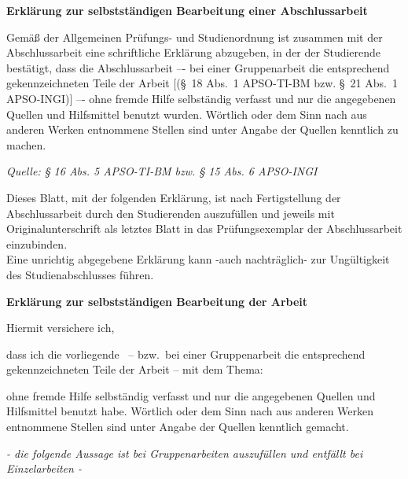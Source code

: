 \clearpage
\thispagestyle{plain}
\ITocEntryStatement
\textbf{\sffamily\large Erklärung zur selbstständigen Bearbeitung einer Abschlussarbeit}

{\footnotesize
Gemäß der Allgemeinen Prüfungs- und Studienordnung ist zusammen mit der Abschlussarbeit eine schriftliche Erklärung abzugeben, in der der Studierende bestätigt, dass die Abschlussarbeit \glqq–- bei einer Gruppenarbeit die entsprechend gekennzeichneten Teile der Arbeit [(§~18 Abs.~1 APSO-TI-BM bzw. §~21 Abs.~1 APSO-INGI)] –- ohne fremde Hilfe selbständig verfasst und nur die angegebenen Quellen und Hilfsmittel benutzt wurden. Wörtlich oder dem Sinn nach aus anderen Werken entnommene Stellen sind unter Angabe der Quellen kenntlich zu machen.\grqq
}

\hfill {\em\footnotesize Quelle: § 16 Abs. 5 APSO-TI-BM bzw. § 15 Abs. 6 APSO-INGI}

{\footnotesize
Dieses Blatt, mit der folgenden Erklärung, ist nach Fertigstellung der Abschlussarbeit durch den Studierenden auszufüllen und jeweils mit Originalunterschrift als letztes Blatt in das Prüfungsexemplar der Abschlussarbeit einzubinden.\\
Eine unrichtig abgegebene Erklärung kann -auch nachträglich- zur Ungültigkeit des Studienabschlusses führen.
}


\vspace{1cm}
\textbf{\sffamily Erklärung zur selbstständigen Bearbeitung der Arbeit}

Hiermit versichere ich,
\par\noindent{}    \makebox[8cm]{\hrulefill}
\par\noindent{} \makebox[8cm]{\hrulefill}

dass ich die vorliegende \IthesisKindDE\ -- bzw.\ bei einer Gruppenarbeit die entsprechend gekennzeichneten Teile der Arbeit -- mit dem Thema:

\textbf{\IthesisTitle}

ohne fremde Hilfe selbständig verfasst und nur die angegebenen Quellen und Hilfsmittel benutzt habe.
Wörtlich oder dem Sinn nach aus anderen Werken entnommene Stellen sind unter Angabe der Quellen kenntlich gemacht.

\begin{center}
  \emph{\footnotesize- die folgende Aussage ist bei Gruppenarbeiten auszufüllen und entfällt bei Einzelarbeiten -}
\end{center}

